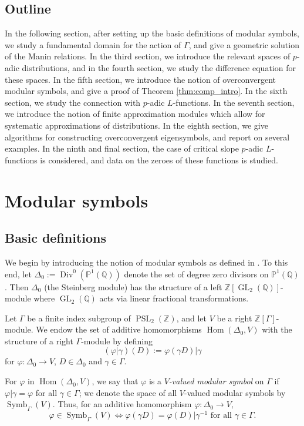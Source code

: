 \documentclass{amsart}
\theoremstyle{plain}
\theoremstyle{definition}
\newcommand{\Z}{{\mathbb Z}}
\newcommand{\Q}{{\mathbb Q}}
\renewcommand{\P}{{\mathbb P}}
\newcommand{\maps}{\rightarrow}
\DeclareMathOperator{\Div}{Div}
\DeclareMathOperator{\Hom}{Hom}
\DeclareMathOperator{\GL}{GL}
\DeclareMathOperator{\PSL}{PSL}
\DeclareMathOperator{\Symb}{Symb}
\newcommand{\MS}[1]{\Symb_{\Gamma}(#1)}
\begin{document}
\subsection{Outline}
In the following section, after setting up the basic definitions of modular symbols, we study a fundamental domain for the action of $\Gamma$, and give a geometric solution of the Manin relations.  In the third section, we introduce the relevant spaces of $p$-adic distributions, and in the fourth section, we study the difference equation for these spaces.  In the fifth section, we introduce the notion of overconvergent modular symbols, and give a proof of Theorem \ref{thm:comp_intro}.  In the sixth section, we study the connection with $p$-adic $L$-functions.  In the seventh section, we introduce the notion of finite approximation modules which allow for systematic approximations of distributions.  In the eighth section, we give algorithms for constructing overconvergent eigensymbols, and report on several examples.  In the ninth and final section, the case of critical slope $p$-adic $L$-functions is considered,  and data on the zeroes of these functions is studied.   

\section{Modular symbols}
\label{sec:ms}

\subsection{Basic definitions}

We begin by introducing the notion of modular symbols as defined in \cite{AshStevens86}.  To this end, let $\Delta_0 := \Div^0(\P^1(\Q))$ denote the set of degree zero divisors on $\P^1(\Q)$.  Then $\Delta_0$ (the Steinberg module) has the structure of a left $\Z[\GL_2(\Q)]$-module where $\GL_2(\Q)$ acts via linear fractional transformations.

Let $\Gamma$ be a finite index subgroup of $\PSL_2(\Z)$, and let $V$ be a right $\Z[\Gamma]$-module.  We endow the set of additive homomorphisms $\Hom(\Delta_0,V)$ with the structure of a right $\Gamma$-module by defining
$$
(\varphi\big| \gamma)(D) := \varphi(\gamma D)\big| \gamma
$$
for $\varphi : \Delta_0 \maps V$, $D \in \Delta_0$ and $\gamma \in \Gamma$. 

For $\varphi$ in $\Hom(\Delta_0,V)$, we say that $\varphi$ is a {\it $V$-valued modular symbol} on $\Gamma$ if $\varphi \big| \gamma = \varphi$ for all $\gamma \in \Gamma$; we denote the space of all $V$-valued modular symbols by $\MS{V}$.  Thus, for an additive homomorphism $\varphi : \Delta_0 \maps V$,
$$
\varphi \in \MS{V} \iff \varphi(\gamma D) = \varphi(D) \big| \gamma^{-1}
\text{~for~all~} \gamma \in \Gamma.
$$
\end{document}

